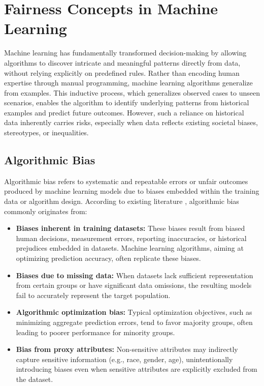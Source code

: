 \section{Fairness Concepts in Machine Learning}\label{sec:fairness_concepts}

Machine learning has fundamentally transformed decision-making by allowing algorithms to discover intricate and
meaningful patterns directly from data, without relying explicitly on predefined rules. Rather than encoding
human expertise through manual programming, machine learning algorithms generalize from examples. This inductive
process, which generalizes observed cases to unseen scenarios, enables the algorithm to identify underlying patterns
from historical examples and predict future outcomes. However, such a reliance on historical data inherently carries
    risks, especially when data reflects existing societal biases, stereotypes, or inequalities.

\subsection{Algorithmic Bias}\label{subsec:algorithmic_bias}

Algorithmic bias refers to systematic and repeatable errors or unfair outcomes produced by machine learning models
due to biases embedded within the training data or algorithm design. According to existing literature
\cite{barocas2016big,pessach2020algorithmic}, algorithmic bias commonly originates from:

\begin{itemize}
    \item \textbf{Biases inherent in training datasets:} These biases result from biased human decisions, measurement errors,
     reporting inaccuracies, or historical prejudices embedded in datasets. Machine learning algorithms, aiming at optimizing
     prediction accuracy, often replicate these biases.
    \item \textbf{Biases due to missing data:} When datasets lack sufficient representation from certain groups or have
     significant data omissions, the resulting models fail to accurately represent the target population.
    \item \textbf{Algorithmic optimization bias:} Typical optimization objectives, such as minimizing aggregate prediction
     errors, tend to favor majority groups, often leading to poorer performance for minority groups.
    \item \textbf{Bias from proxy attributes:} Non-sensitive attributes may indirectly capture sensitive information
     (e.g., race, gender, age), unintentionally introducing biases even when sensitive attributes are explicitly excluded
     from the dataset.
\end{itemize}

